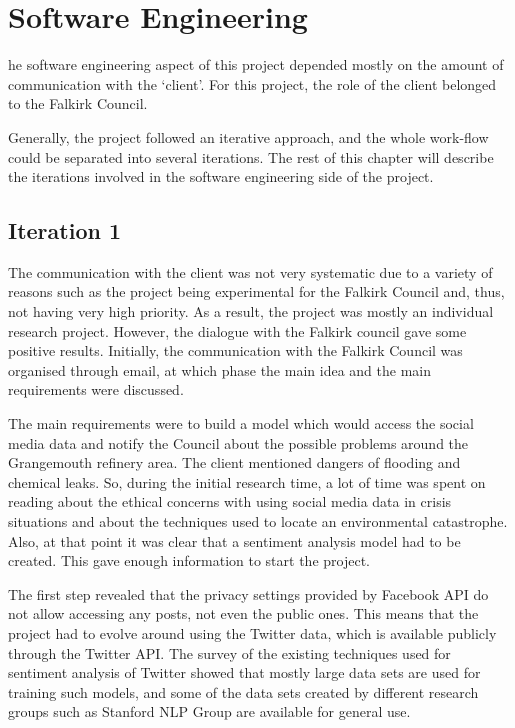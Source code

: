 \let\textcircled=\pgftextcircled
\chapter{Software Engineering}
\label{chap:software-engineering}

he software engineering aspect of this project depended mostly on the amount of communication with the `client'. For this project, the role of the client belonged to the Falkirk Council. 

Generally, the project followed an iterative approach, and the whole work-flow could be separated into several iterations. The rest of this chapter will describe the iterations involved in the software engineering side of the project. 

\section{Iteration 1}
\label{sec:it1}

The communication with the client was not very systematic due to a variety of reasons such as the project being experimental for the Falkirk Council and, thus, not having very high priority. As a result, the project was mostly an individual research project. However, the dialogue with the Falkirk council gave some positive results. Initially, the communication with the Falkirk Council was organised through email, at which phase the main idea and the main requirements were discussed.

The main requirements were to build a model which would access the social media data and notify the Council about the possible problems around the Grangemouth refinery area. The client mentioned dangers of flooding and chemical leaks. So, during the initial research time, a lot of time was spent on reading about the ethical concerns with using social media data in crisis situations and about the techniques used to locate an environmental catastrophe. Also, at that point it was clear that a sentiment analysis model had to be created. 
This gave enough information to start the project. 

The first step revealed that the privacy settings provided by Facebook API do not allow accessing any posts, not even the public ones. This means that the project had to evolve around using the Twitter data, which is available publicly through the Twitter API. The survey of the existing techniques used for sentiment analysis of Twitter showed that mostly large data sets are used for training such models, and some of the data sets created by different research groups such as Stanford NLP Group are available for general use. 

